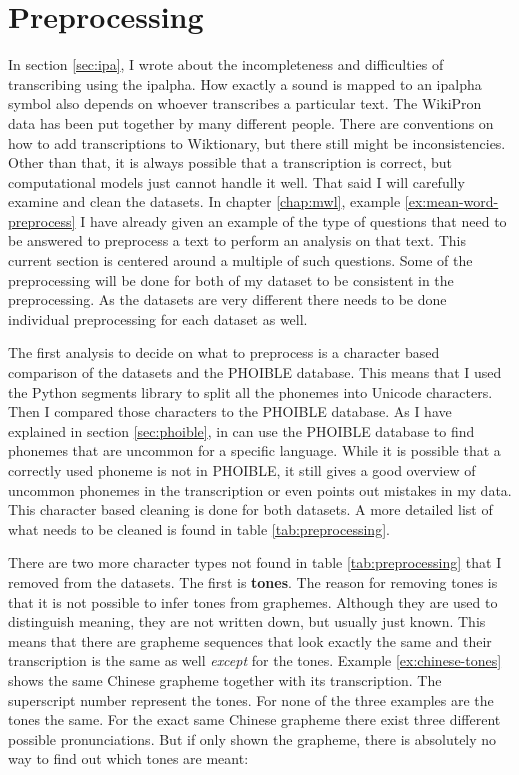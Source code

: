 \section{Preprocessing}
\label{preprocess}
In section \ref{sec:ipa}, I wrote about the incompleteness and difficulties of transcribing using the \ac{ipalpha}. How exactly a sound is mapped to an \ac{ipalpha} symbol also depends on whoever transcribes a particular text. The WikiPron data has been put together by many different people. There are conventions on how to add transcriptions to Wiktionary, but there still might be inconsistencies. Other than that, it is always possible that a transcription is correct, but computational models just cannot handle it well. That said I will carefully examine and clean the datasets. In chapter \ref{chap:mwl}, example \ref{ex:mean-word-preprocess} I have already given an example of the type of questions that need to be answered to preprocess a text to perform an analysis on that text. This current section is centered around a multiple of such questions.
Some of the preprocessing will be done for both of my dataset to be consistent in the preprocessing. As the datasets are very different there needs to be done individual preprocessing for each dataset as well.

The first analysis to decide on what to preprocess is a character based comparison of the datasets and the PHOIBLE database. This means that I used the Python segments library to split all the phonemes into Unicode characters. Then I compared those characters to the PHOIBLE database. As I have explained in section \ref{sec:phoible}, in can use the PHOIBLE database to find phonemes that are uncommon for a specific language. While it is possible that a correctly used phoneme is not in PHOIBLE, it still gives a good overview of uncommon phonemes in the transcription or even points out mistakes in my data. This character based cleaning is done for both datasets. A more detailed list of what needs to be cleaned is found in table \ref{tab:preprocessing}.

There are two more character types not found in table \ref{tab:preprocessing} that I removed from the datasets. The first is \textbf{tones}. The reason for removing tones is that it is not possible to infer tones from graphemes. Although they are used to distinguish meaning, they are not written down, but usually just known. This means that there are grapheme sequences that look exactly the same and their transcription is the same as well \textit{except} for the tones. Example \ref{ex:chinese-tones} shows the same Chinese grapheme together with its transcription. The superscript number represent the tones. For none of the three examples are the tones the same. For the exact same Chinese grapheme there exist three different possible pronunciations. But if only shown the grapheme, there is absolutely no way to find out which tones are meant:

